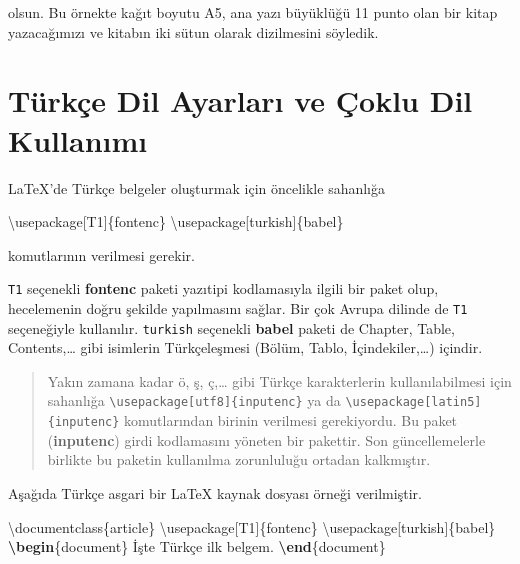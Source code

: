 \documentclass[
  10pt,
]{scrbook}
\newenvironment{Shaded}{\begin{snugshade}}{\end{snugshade}}
\newcommand{\BuiltInTok}[1]{#1}
\newcommand{\ExtensionTok}[1]{#1}
\newcommand{\KeywordTok}[1]{\textcolor[rgb]{0.13,0.29,0.53}{\textbf{#1}}}
\newcommand{\NormalTok}[1]{#1}
\theoremstyle{definition}
\theoremstyle{definition}
\theoremstyle{definition}
\theoremstyle{definition}
\theoremstyle{remark}
\begin{document}
olsun. Bu örnekte kağıt boyutu A5, ana yazı büyüklüğü 11 punto olan bir kitap yazacağımızı ve kitabın iki sütun olarak dizilmesini söyledik.

\hypertarget{turkce}{%
\section{Türkçe Dil Ayarları ve Çoklu Dil Kullanımı}\label{turkce}}

LaTeX'de Türkçe belgeler oluşturmak için öncelikle sahanlığa

\begin{Shaded}
\begin{Highlighting}[]
\BuiltInTok{\textbackslash{}usepackage}\NormalTok{[T1]\{}\ExtensionTok{fontenc}\NormalTok{\}}
\BuiltInTok{\textbackslash{}usepackage}\NormalTok{[turkish]\{}\ExtensionTok{babel}\NormalTok{\}}
\end{Highlighting}
\end{Shaded}

komutlarının verilmesi gerekir.

\texttt{T1} seçenekli \textbf{fontenc} paketi yazıtipi kodlamasıyla ilgili bir paket olup, hecelemenin doğru şekilde yapılmasını sağlar. Bir çok Avrupa dilinde de \texttt{T1} seçeneğiyle kullanılır. \texttt{turkish} seçenekli \textbf{babel} paketi de Chapter, Table, Contents,\ldots{} gibi isimlerin Türkçeleşmesi (Bölüm, Tablo, İçindekiler,\ldots) içindir.

\begin{quote}
Yakın zamana kadar ö, ş, ç,\ldots{} gibi Türkçe karakterlerin kullanılabilmesi için sahanlığa \texttt{\textbackslash{}usepackage{[}utf8{]}\{inputenc\}} ya da \texttt{\textbackslash{}usepackage{[}latin5{]}\{inputenc\}} komutlarından birinin verilmesi gerekiyordu. Bu paket (\textbf{inputenc}) girdi kodlamasını yöneten bir pakettir. Son güncellemelerle birlikte bu paketin kullanılma zorunluluğu ortadan kalkmıştır.
\end{quote}

Aşağıda Türkçe asgari bir LaTeX kaynak dosyası örneği verilmiştir.

\begin{Shaded}
\begin{Highlighting}[]
\BuiltInTok{\textbackslash{}documentclass}\NormalTok{\{}\ExtensionTok{article}\NormalTok{\}}
\BuiltInTok{\textbackslash{}usepackage}\NormalTok{[T1]\{}\ExtensionTok{fontenc}\NormalTok{\}}
\BuiltInTok{\textbackslash{}usepackage}\NormalTok{[turkish]\{}\ExtensionTok{babel}\NormalTok{\}}
\KeywordTok{\textbackslash{}begin}\NormalTok{\{}\ExtensionTok{document}\NormalTok{\}}
\NormalTok{  İşte  Türkçe ilk belgem.}
\KeywordTok{\textbackslash{}end}\NormalTok{\{}\ExtensionTok{document}\NormalTok{\}}
\end{Highlighting}
\end{Shaded}
\end{document}
